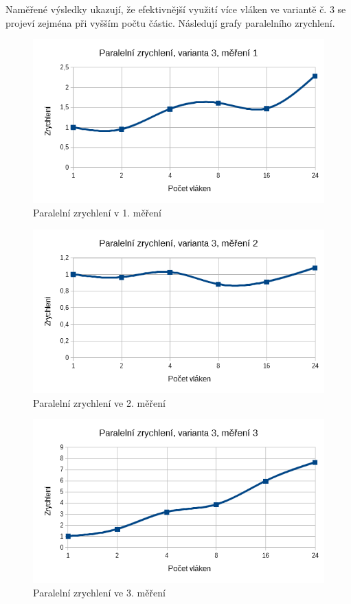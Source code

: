 \documentclass[12pt]{article}
\begin{document}
Naměřené výsledky ukazují, že efektivnější využití více vláken ve variantě č. 3 se projeví zejména při vyšším počtu částic.
Následují grafy paralelního zrychlení.

\begin{figure}[H]
  \begin{center}
     \includegraphics[width=12cm]{images/ssef1acc.png}
    \caption{Paralelní zrychlení v 1. měření} 
  \end{center}
\end{figure}

\begin{figure}[H]
  \begin{center}
     \includegraphics[width=12cm]{images/ssef2acc.png}
    \caption{Paralelní zrychlení ve 2. měření} 
  \end{center}
\end{figure}

\begin{figure}[H]
  \begin{center}
     \includegraphics[width=12cm]{images/ssef3acc.png}
    \caption{Paralelní zrychlení ve 3. měření} 
  \end{center}
\end{figure}
\end{document}
